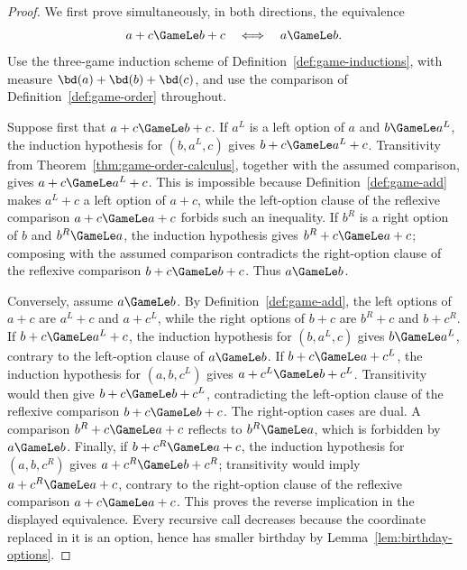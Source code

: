 \begin{proof}
  \leanok
  We first prove simultaneously, in both directions, the equivalence
  \[
    a+c\GameLe b+c\quad\Longleftrightarrow\quad a\GameLe b.
  \]
  Use the three-game induction scheme of Definition~\ref{def:game-inductions}, with measure
  \(\bd(a)+\bd(b)+\bd(c)\), and use the comparison of
  Definition~\ref{def:game-order} throughout.

  Suppose first that \(a+c\GameLe b+c\).  If \(a^L\) is a left option of
  \(a\) and \(b\GameLe a^L\), the induction hypothesis for
  \((b,a^L,c)\) gives \(b+c\GameLe a^L+c\).  Transitivity from
  Theorem~\ref{thm:game-order-calculus}, together with the assumed comparison,
  gives \(a+c\GameLe a^L+c\).  This is impossible because
  Definition~\ref{def:game-add} makes \(a^L+c\) a left option of \(a+c\),
  while the left-option clause of the reflexive comparison
  \(a+c\GameLe a+c\) forbids such an inequality.  If \(b^R\) is a right
  option of \(b\) and \(b^R\GameLe a\), the induction hypothesis gives
  \(b^R+c\GameLe a+c\); composing with the assumed comparison contradicts the
  right-option clause of the reflexive comparison \(b+c\GameLe b+c\).  Thus
  \(a\GameLe b\).

  Conversely, assume \(a\GameLe b\).  By Definition~\ref{def:game-add}, the
  left options of \(a+c\) are \(a^L+c\) and \(a+c^L\), while the right
  options of \(b+c\) are \(b^R+c\) and \(b+c^R\).  If
  \(b+c\GameLe a^L+c\), the induction hypothesis for \((b,a^L,c)\) gives
  \(b\GameLe a^L\), contrary to the left-option clause of \(a\GameLe b\).
  If \(b+c\GameLe a+c^L\), the induction hypothesis for \((a,b,c^L)\)
  gives \(a+c^L\GameLe b+c^L\).  Transitivity would then give
  \(b+c\GameLe b+c^L\), contradicting the left-option clause of the reflexive
  comparison \(b+c\GameLe b+c\).  The right-option cases are dual.  A
  comparison \(b^R+c\GameLe a+c\) reflects to \(b^R\GameLe a\), which is
  forbidden by \(a\GameLe b\).  Finally, if
  \(b+c^R\GameLe a+c\), the induction hypothesis for \((a,b,c^R)\) gives
  \(a+c^R\GameLe b+c^R\); transitivity would imply
  \(a+c^R\GameLe a+c\), contrary to the right-option clause of the reflexive
  comparison \(a+c\GameLe a+c\).  This proves the reverse implication in the
  displayed equivalence.
  Every recursive call decreases because the coordinate replaced in it is an
  option, hence has smaller birthday by Lemma~\ref{lem:birthday-options}.


\end{proof}
